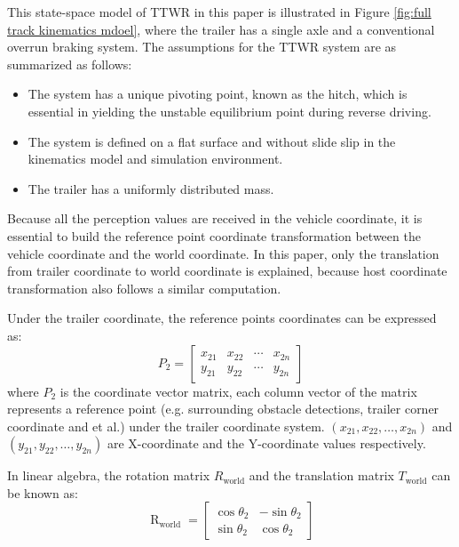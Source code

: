 This state-space model of TTWR in this paper is illustrated in Figure \ref{fig:full track kinematics mdoel}, where the trailer has a single axle and a conventional overrun braking system. The assumptions for the TTWR system are as summarized as follows: 

\begin{itemize}
  \item The system has a unique pivoting point, known as the hitch, which is essential in yielding the unstable equilibrium point during reverse driving.
  \item The system is defined on a flat surface and without slide slip in the kinematics model and simulation environment.
  \item The trailer has a uniformly distributed mass.
\end{itemize}

Because all the perception values are received in the vehicle coordinate, it is essential to build the reference point coordinate transformation between the vehicle coordinate and the world coordinate. In this paper, only the translation from trailer coordinate to world coordinate is explained, because host coordinate transformation also follows a similar computation.

Under the trailer coordinate, the reference points coordinates can be expressed as:
\begin{equation}
P_2=\left[\begin{array}{cccc}
x_{21} & x_{22} & \cdots & x_{2n} \\
y_{21} & y_{22} & \cdots & y_{2n}
\end{array}\right]
\label{eq: reference point matrix}
\end{equation}
where $P_2$ is the coordinate vector matrix, each column vector of the matrix represents a reference point (e.g. surrounding obstacle detections, trailer corner coordinate and et al.) under the trailer coordinate system. $\left(x_{21}, x_{22}, \ldots, x_{2n}\right)$ and $\left(y_{21}, y_{22}, \ldots, y_{2n}\right)$ are X-coordinate and the Y-coordinate values respectively.

In linear algebra, the rotation matrix $R_\text{world}$ and the translation matrix $T_\text{world}$ can be known as:
\begin{equation}
\operatorname{R}_\text{world} = \left[\begin{array}{ccc}
\cos \theta_2 & -\sin \theta_2 \\
\sin \theta_2 & \cos \theta_2
\end{array}\right]
\label{eq: rotation matrix}
\end{equation}

